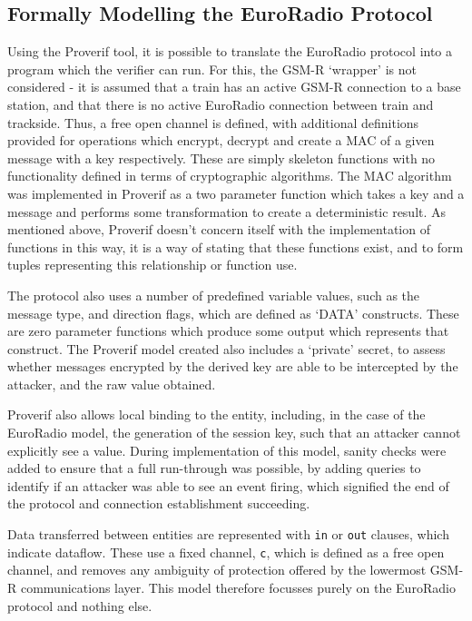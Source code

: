 \documentclass[twoside,11pt,a4paper]{article}
\begin{document}
\subsection{Formally Modelling the EuroRadio Protocol}
Using the Proverif tool, it is possible to translate the EuroRadio protocol into a program which the verifier can run. For this, the GSM-R `wrapper' is not considered - it is assumed that a train has an active GSM-R connection to a base station, and that there is no active EuroRadio connection between train and trackside. Thus, a free open channel is defined, with additional definitions provided for operations which encrypt, decrypt and create a MAC of a given message with a key respectively. These are simply skeleton functions with no functionality defined in terms of cryptographic algorithms. The MAC algorithm was implemented in Proverif as a two parameter function which takes a key and a message and performs some transformation to create a deterministic result. As mentioned above, Proverif doesn't concern itself with the implementation of functions in this way, it is a way of stating that these functions exist, and to form tuples representing this relationship or function use.

The protocol also uses a number of predefined variable values, such as the message type, and direction flags, which are defined as `DATA' constructs. These are zero parameter functions which produce some output which represents that construct. The Proverif model created also includes a `private' secret, to assess whether messages encrypted by the derived key are able to be intercepted by the attacker, and the raw value obtained.

Proverif also allows local binding to the entity, including, in the case of the EuroRadio model, the generation of the session key, such that an attacker cannot explicitly see a value. During implementation of this model, sanity checks were added to ensure that a full run-through was possible, by adding queries to identify if an attacker was able to see an event firing, which signified the end of the protocol and connection establishment succeeding.

Data transferred between entities are represented with \texttt{in} or \texttt{out} clauses, which indicate dataflow. These use a fixed channel, \texttt{c}, which is defined as a free open channel, and removes any ambiguity of protection offered by the lowermost GSM-R communications layer. This model therefore focusses purely on the EuroRadio protocol and nothing else. 
\end{document}
